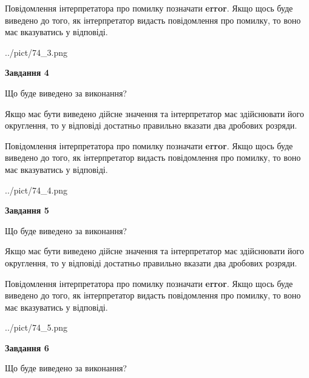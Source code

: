 \documentclass[12pt, ukrainian]{article}
\begin{document}
{\begin {Large}
Повідомлення інтерпретатора про помилку позначати \textbf{error}.
Якщо щось буде виведено до того, як інтерпретатор видасть повідомлення про помилку, 
то воно має вказуватись у відповіді. \par

\begin{center}
	{../pict/74_3.png}
\end{center}
\newpage

{\begin {center}\textbf{Завдання 4}\end {center}}\par
Що буде виведено за виконання? \par

Якщо має бути виведено дійсне значення та інтерпретатор має здійснювати його округлення, 
то у відповіді достатньо правильно вказати два дробових розряди.

Повідомлення інтерпретатора про помилку позначати \textbf{error}.
Якщо щось буде виведено до того, як інтерпретатор видасть повідомлення про помилку, 
то воно має вказуватись у відповіді. \par

\begin{center}
	{../pict/74_4.png}
\end{center}
\newpage

{\begin {center}\textbf{Завдання 5}\end {center}}\par
Що буде виведено за виконання? \par

Якщо має бути виведено дійсне значення та інтерпретатор має здійснювати його округлення, 
то у відповіді достатньо правильно вказати два дробових розряди.

Повідомлення інтерпретатора про помилку позначати \textbf{error}.
Якщо щось буде виведено до того, як інтерпретатор видасть повідомлення про помилку, 
то воно має вказуватись у відповіді. \par

\begin{center}
	{../pict/74_5.png}
\end{center}
\newpage

{\begin {center}\textbf{Завдання 6}\end {center}}\par
Що буде виведено за виконання? \par


\end{Large}}
\end{document}
